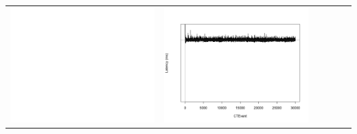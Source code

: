 \begin{table}[htbp]
{\begin{tabular}{l | ccccc}
\begin{minipage}{.15\textwidth}
     			 	\includegraphics[width=\linewidth]{images/lat-log-triple/N5}
    				 \end{minipage}
    			   &	 \begin{minipage}{.15\textwidth}\vspace{2pt}     							
     			 	\includegraphics[width=\linewidth]{images/lat-log-triple/N9}
    				 \end{minipage}
    			   &	 \begin{minipage}{.15\textwidth}\vspace{2pt}     							

\end{minipage}
\end{tabular}}
\end{table}
